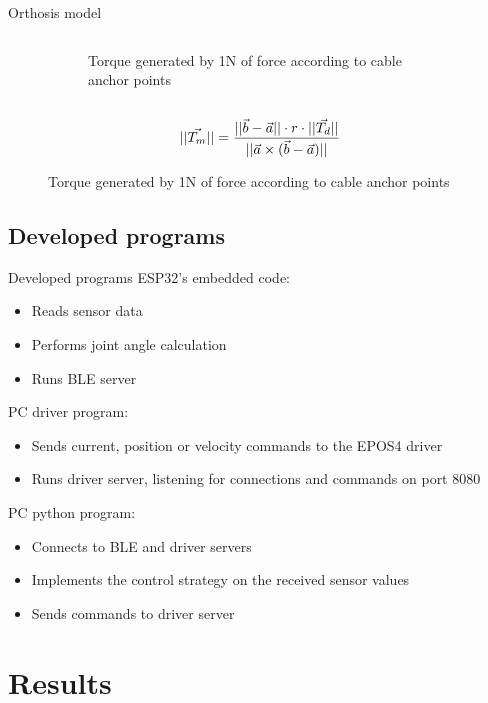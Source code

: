 \documentclass[aspectratio=169]{beamer}
\begin{document}
\begin{frame}{Orthosis model}
\begin{figure}[htbp]
\begin{columns}
\begin{column}{0.5\textwidth}
\begin{figure}[htbp]
	  \caption{Torque generated by 1N of force according to cable anchor points}
	  \label{fig:model_1N}
    \end{figure}
    \end{column}
    \end{columns}
\begin{equation}
  \centering
  ||\vec{T_m}|| = \frac{||\vec{b}-\vec{a}|| \cdot r \cdot ||\vec{T_d}||}{||\vec{a} \times (\vec{b}-\vec{a})||}  
  \label{eq:inv_model}
\end{equation}  
\end{figure}
\end{frame}

\subsection{Developed programs}
\begin{frame}{Developed programs}
ESP32's embedded code:
\begin{itemize}
  \item Reads sensor data
  \item Performs joint angle calculation
  \item Runs BLE server
\end{itemize}
PC driver program:
\begin{itemize}
  \item Sends current, position or velocity commands to the EPOS4 driver
  \item Runs driver server, listening for connections and commands on port 8080
\end{itemize}
PC python program:
\begin{itemize}
  \item Connects to BLE and driver servers
  \item Implements the control strategy on the received sensor values
  \item Sends commands to driver server
\end{itemize}
\end{frame}

\section{Results}
\end{document}

